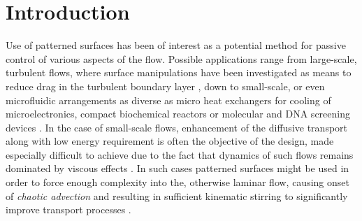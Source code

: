 \documentclass[lineno]{jfm}
\begin{document}
\section{Introduction}\label{sec:intro}
Use of patterned surfaces has been of interest as a potential method for passive control of various aspects of the flow.
Possible applications range from large-scale, turbulent flows, where surface manipulations have been investigated as means to reduce drag in the turbulent boundary layer \citep[i.e. riblets, see e.g.][]{luchini_manzo_pozzi_1991,goldstein_tuan_1998,jimenez2004turbulent},
down to small-scale, or even microfluidic arrangements as diverse as micro heat exchangers
for cooling of microelectronics, compact biochemical reactors or molecular and DNA screening devices \citep{Beebe2002}.
In the case of small-scale flows, enhancement of the diffusive transport \citep[see][for an extensive review]{Aref2017} along with low energy requirement is often the objective of the design, made especially difficult to achieve due to the fact that dynamics of such flows remains dominated by viscous effects \citep{Webb1983, Gepner2020b}.
In such cases patterned surfaces might be used in order to force enough complexity into the, otherwise laminar flow, causing onset of {\it chaotic advection} \citep{Aref1984, Aref2017} and resulting in sufficient kinematic stirring to significantly improve transport processes \citep{Stroock2002, Stremler2004}.

\end{document}
